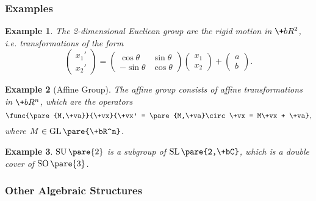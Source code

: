 \documentclass[hidelinks]{article}
\newtheorem{example}{Example}
\DeclareMathOperator{\GL}{GL}
\DeclareMathOperator{\SU}{SU}
\DeclareMathOperator{\SO}{SO}
\DeclareMathOperator{\SL}{SL}
\begin{document}

\subsubsection{Examples} %
\label{ssub:examples}

\begin{sample}
    \begin{example}
        The 2-dimensional Eucliean group are the rigid motion in $\+bR^2$, i.e. transformations of the form
        \[ \begin{pmatrix}
            x_1' \\ x_2'
        \end{pmatrix} = \begin{pmatrix}
            \cos\theta & \sin\theta \\
            -\sin\theta & \cos\theta
        \end{pmatrix}\begin{pmatrix}
            x_1 \\ x_2
        \end{pmatrix} + \begin{pmatrix}
            a \\ b
        \end{pmatrix}. \]
    \end{example}
\end{sample}
\begin{sample}
    \begin{example}[Affine Group]
        The affine group consists of affine transformations in $\+bR^n$, which are the operators
        \[ \func{\pare{M,\+va}}{\+vx}{\+vx' = \pare{M,\+va}\circ \+vx = M\+vx + \+va}, \]
        where $M \in \GL\pare{\+bR^n}$.
    \end{example}
\end{sample}
\begin{sample}
    \begin{example}
        $\SU\pare{2}$ is a subgroup of $\SL\pare{2,\+bC}$, which is a double cover of $\SO\pare{3}$.
    \end{example}
\end{sample}


\subsubsection{Other Algebraic Structures} %
\label{ssub:other_algebraic_structures}
\end{document}
